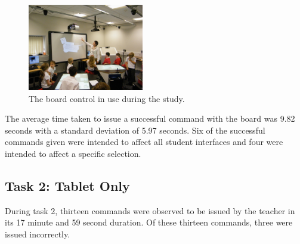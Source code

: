 \documentclass[link]{IWCOMP}
\begin{document}
\begin{figure}[h]
   \centering
   \includegraphics[width=0.45\textwidth]{figures/study_board.png}
   \caption{The board control in use during the study.}
   \label{fig:studyBoard}
\end{figure}

The average time taken to issue a successful command with the board was 9.82 seconds with a standard deviation of 5.97 seconds.
Six of the successful commands given were intended to affect all student interfaces and four were intended to affect a specific selection.

\subsection{Task 2: Tablet Only}
\label{subsec:resultsTask2}

During task 2, thirteen commands were observed to be issued by the teacher in its 17 minute and 59 second duration.
Of these thirteen commands, three were issued incorrectly.
\end{document}
